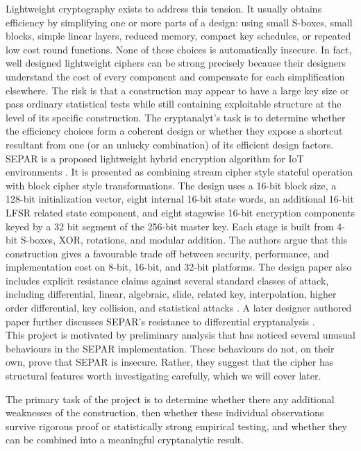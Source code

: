 \documentclass[11pt]{article}
\begin{document}
Lightweight cryptography exists to address this tension. It usually obtains efficiency by simplifying one or more parts of a design: using small S-boxes, small blocks, simple linear layers, reduced memory, compact key schedules, or repeated low cost round functions. None of these choices is automatically insecure. In fact, well designed lightweight ciphers can be strong precisely because their designers understand the cost of every component and compensate for each simplification elsewhere. The risk is that a construction may appear to have a large key size or pass ordinary statistical tests while still containing exploitable structure at the level of its specific construction. The cryptanalyt's task is to determine whether the efficiency choices form a coherent design or whether they expose a shortcut resultant from one (or an unlucky combination) of its efficient design factors.\\

SEPAR is a proposed lightweight hybrid encryption algorithm for IoT environments \cite{VahiJassbi2020}. It is presented as combining stream cipher style stateful operation with block cipher style transformations. The design uses a 16-bit block size, a 128-bit initialization vector, eight internal 16-bit state words, an additional 16-bit LFSR related state component, and eight stagewise 16-bit encryption components keyed by a 32 bit segment of the 256-bit master key. Each stage is built from 4-bit S-boxes, XOR, rotations, and modular addition. The authors argue that this construction gives a favourable trade off between security, performance, and implementation cost on 8-bit, 16-bit, and 32-bit platforms. The design paper also includes explicit resistance claims against several standard classes of attack, including differential, linear, algebraic, slide, related key, interpolation, higher order differential, key collision, and statistical attacks \cite{VahiJassbi2020}. A later designer authored paper further discusses SEPAR's resistance to differential cryptanalysis \cite{VahiMirnia2021}.\\

This project is motivated by preliminary analysis that has noticed several unusual behaviours in the SEPAR implementation. These behaviours do not, on their own, prove that SEPAR is insecure. Rather, they suggest that the cipher has structural features worth investigating carefully, which we will cover later.

The primary task of the project is to determine whether there any additional weaknesses of the construction, then whether these individual observations survive rigorous proof or statistically strong empirical testing, and whether they can be combined into a meaningful cryptanalytic result.\\
\newpage 
\end{document}
